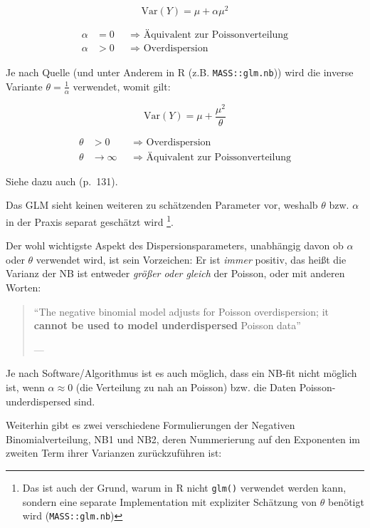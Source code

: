 \documentclass[ngerman,a4paper,]{scrartcl}
\theoremstyle{definition}
\theoremstyle{definition}
\theoremstyle{definition}
\theoremstyle{remark}
\begin{document}
\[\mathrm{Var}(Y) = \mu + \alpha \mu^2\]

\begin{align*}
  \alpha &= 0 &&\Longrightarrow \text{ Äquivalent zur Poissonverteilung} \\
  \alpha &> 0 &&\Longrightarrow \text{ Overdispersion}
\end{align*}

Je nach Quelle (und unter Anderem in R (z.B. \texttt{MASS::glm.nb})) wird die inverse Variante \(\theta = \frac 1 \alpha\) verwendet, womit gilt:

\[\mathrm{Var}(Y) = \mu + \frac{\mu^2}{\theta}\]

\begin{align*}
  \theta &> 0 &&\Longrightarrow \text{ Overdispersion} \\
  \theta &\to \infty &&\Longrightarrow \text{ Äquivalent zur Poissonverteilung}
\end{align*}

Siehe dazu auch \citet{hilbeModelingCountData2014} (p.~131).

Das GLM sieht keinen weiteren zu schätzenden Parameter vor, weshalb \(\theta\) bzw. \(\alpha\) in der Praxis separat geschätzt wird \footnote{Das ist auch der Grund, warum in R nicht \texttt{glm()} verwendet werden kann, sondern eine separate Implementation mit expliziter Schätzung von \(\theta\) benötigt wird (\texttt{MASS::glm.nb})}.

Der wohl wichtigste Aspekt des Dispersionsparameters, unabhängig davon ob \(\alpha\) oder \(\theta\) verwendet wird, ist sein Vorzeichen: Er ist \emph{immer} positiv, das heißt die Varianz der NB ist entweder \emph{größer oder gleich} der Poisson, oder mit anderen Worten:

\begin{quote}
\enquote{The negative binomial model adjusts for Poisson overdispersion; it \textbf{cannot be used to model underdispersed} Poisson data}

--- \citep[ (p.~11), eigene Hervorhebung]{hilbeModelingCountData2014}
\end{quote}

Je nach Software/Algorithmus ist es auch möglich, dass ein NB-fit nicht möglich ist, wenn \(\alpha \approx 0\) (die Verteilung zu nah an Poisson) bzw. die Daten Poisson-underdispersed sind.

Weiterhin gibt es zwei verschiedene Formulierungen der Negativen Binomialverteilung, NB1 und NB2, deren Nummerierung auf den Exponenten im zweiten Term ihrer Varianzen zurückzuführen ist:
\end{document}
